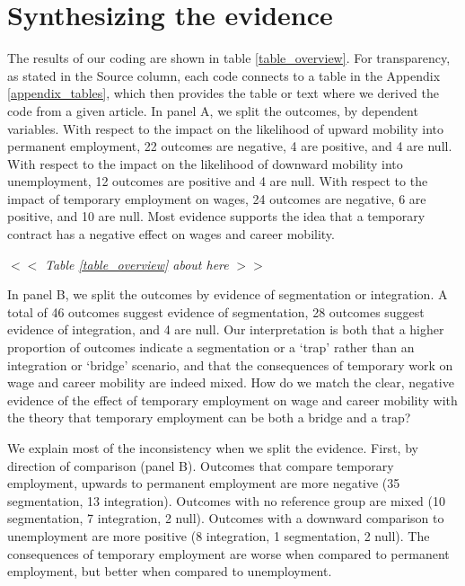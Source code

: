 \documentclass[12pt]{article}
\begin{document}
\section{Synthesizing the evidence}

The results of our coding are shown in table \ref{table_overview}.  For transparency, as stated in the Source column, each code connects to a table in the Appendix \ref{appendix_tables}, which then provides the table or text where we derived the code from a given article.  In panel A, we split the outcomes, by dependent variables.  With respect to the impact on the likelihood of upward mobility into permanent employment, 22 outcomes are negative, 4 are positive, and 4 are null.  With respect to the impact on the likelihood of downward mobility into unemployment, 12 outcomes are positive and 4 are null.  With respect to the impact of temporary employment on wages, 24 outcomes are negative, 6 are positive, and 10 are null.  Most evidence supports the idea that a temporary contract has a negative effect on wages and career mobility.

\begin{center}
$<<$ \emph{Table \ref{table_overview} about here} $>>$
\end{center}

In panel B, we split the outcomes by evidence of segmentation or integration.  A total of 46 outcomes suggest evidence of segmentation, 28 outcomes suggest evidence of integration, and 4 are null.  Our interpretation is both that a higher proportion of outcomes indicate a segmentation or a `trap' rather than an integration or `bridge' scenario, and that the consequences of temporary work on wage and career mobility are indeed mixed.  How do we match the clear, negative evidence of the effect of temporary employment on wage and career mobility with the theory that temporary employment can be both a bridge and a trap?  

We explain most of the inconsistency when we split the evidence.  First, by direction of comparison (panel B).  Outcomes that compare temporary employment, upwards to permanent employment are more negative (35 segmentation, 13 integration).  Outcomes with no reference group are mixed (10 segmentation, 7 integration, 2 null).  Outcomes with a downward comparison to unemployment are more positive (8 integration, 1 segmentation, 2 null).  The consequences of temporary employment are worse when compared to permanent employment, but better when compared to unemployment.  
\end{document}
